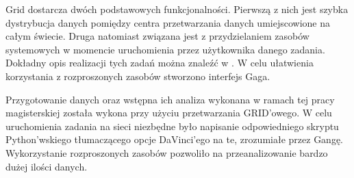 Grid dostarcza dwóch podstawowych funkcjonalności. Pierwszą z nich jest szybka dystrybucja danych pomiędzy centra przetwarzania danych umiejscowione na całym świecie. Druga natomiast związana jest z przydzielaniem zasobów systemowych w momencie uruchomienia przez użytkownika danego zadania. Dokładny opis realizacji tych zadań można znaleźć w \cite{Grid}.  W celu ułatwienia korzystania z rozproszonych zasobów stworzono interfejs Gaga\citep{Ganga}.

Przygotowanie danych oraz wstępna ich  analiza wykonana w ramach tej pracy magisterskiej została wykona przy użyciu przetwarzania GRID'owego. W celu uruchomienia zadania na sieci niezbędne było napisanie odpowiedniego skryptu Python'wskiego tłumaczącego opcje DaVinci'ego na te, zrozumiałe przez Gangę. Wykorzystanie rozproszonych zasobów pozwoliło na  przeanalizowanie bardzo dużej ilości danych. 



